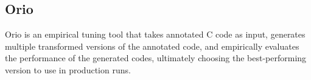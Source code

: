 \documentclass[runningheads]{llncs}
\begin{document}
%







\subsection{Orio}
\label{sec:orio}

Orio\cite{Norris:2007,Hartono:IPDPS09} is an empirical tuning tool that takes
annotated C code as input, generates multiple transformed versions of the
annotated code, and empirically evaluates the performance of the generated
codes, ultimately choosing the best-performing version to use in production
runs.
\end{document}
